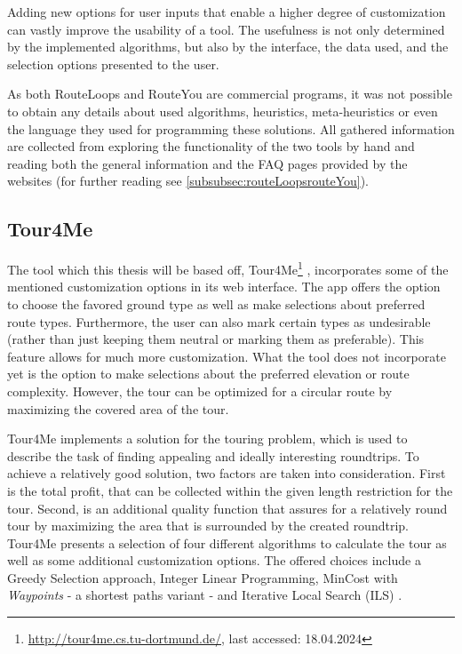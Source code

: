 Adding new options for user inputs that enable a higher degree of customization can vastly improve the usability of a tool. 
The usefulness is not only determined by the implemented algorithms, but also by the interface, the data used, and the selection options presented to the user. 

As both RouteLoops and RouteYou are commercial programs, it was not possible to obtain any details about used algorithms, heuristics, meta-heuristics or even the language they used for programming these solutions.
All gathered information are collected from exploring the functionality of the two tools by hand and reading both the general information and the FAQ pages provided by the websites (for further reading see \ref{subsubsec:routeLoopsrouteYou}). 

\subsection{Tour4Me}
\label{subsec:Tour4Me}

The tool which this thesis will be based off, Tour4Me\footnote{\url{http://tour4me.cs.tu-dortmund.de/}, last accessed: 18.04.2024} \cite{buchin_tour4me_2022}, incorporates some of the mentioned customization options in its web interface. 
The app offers the option to choose the favored ground type as well as make selections about preferred route types.
Furthermore, the user can also mark certain types as undesirable (rather than just keeping them neutral or marking them as preferable).
This feature allows for much more customization.
What the tool does not incorporate yet is the option to make selections about the preferred elevation or route complexity.
However, the tour can be optimized for a circular route by maximizing the covered area of the tour. 

Tour4Me implements a solution for the \glqq touring problem\grqq , which is used to describe the task of finding appealing and ideally interesting roundtrips.
To achieve a relatively good solution, two factors are taken into consideration.
First is the total profit, that can be collected within the given length restriction for the tour.
Second, is an additional quality function that assures for a relatively round tour by maximizing the area that is surrounded by the created roundtrip.
Tour4Me presents a selection of four different algorithms to calculate the tour as well as some additional customization options.
The offered choices include a Greedy Selection approach, Integer Linear Programming, MinCost with \textit{Waypoints} - a shortest paths variant - and Iterative Local Search (ILS) \cite{buchin_tour4me_2022}. 

